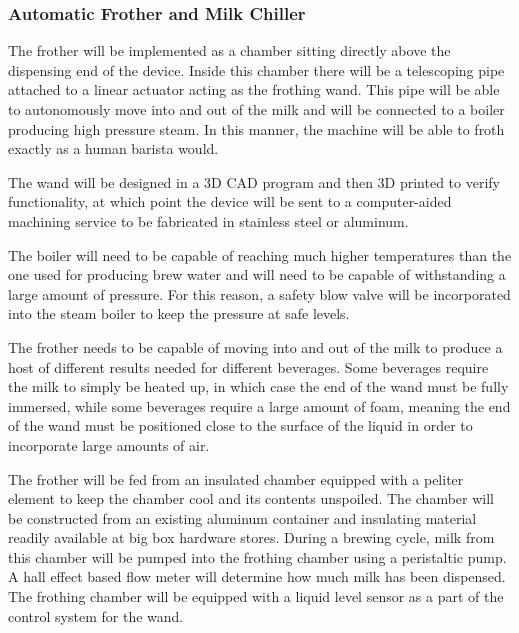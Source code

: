 \documentclass[conference]{IEEEtran}
\begin{document}

\subsubsection{Automatic Frother and Milk Chiller}
The frother will be implemented as a chamber sitting directly above the
dispensing end of the device. Inside this chamber there will be a telescoping pipe
attached to a linear actuator acting as the frothing wand. This pipe will be
able to autonomously move into and out of the milk and will be connected to a boiler
producing high pressure steam. In this manner, the machine will be able to froth
exactly as a human barista would.

The wand will be designed in a 3D CAD program and then 3D printed to verify
functionality, at which point the device will be sent to a computer-aided
machining service to be fabricated in stainless steel or aluminum.

The boiler will need to be capable of reaching much higher temperatures than the
one used for producing brew water and will need to be capable of withstanding a
large amount of pressure. For this reason, a safety blow valve will be incorporated
into the steam boiler to keep the pressure at safe levels.


The frother needs to be capable of moving into and out of the milk to produce a host
of different results needed for different beverages. Some beverages require the milk
to simply be heated up, in which case the end of the wand must be fully immersed, while
some beverages require a large amount of foam, meaning the end of the wand must be positioned
close to the surface of the liquid in order to incorporate large amounts of air.

The frother will be fed from an insulated chamber equipped with a peliter element
to keep the chamber cool and its contents unspoiled. The chamber will be constructed from
an existing aluminum container and insulating material readily available at big
box hardware stores.
During a brewing cycle, milk from this chamber will be pumped into the frothing
chamber using a peristaltic pump. A hall effect based flow meter will determine how much milk has been dispensed. The frothing chamber
will be equipped with a liquid level sensor as a part of the control system for
the wand.
\end{document}
